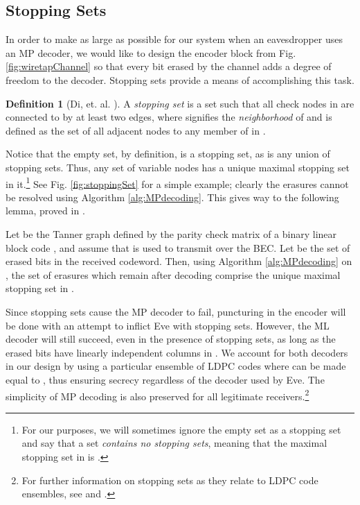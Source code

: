 \documentclass[10pt,twocolumn,twoside]{IEEEtran} \newlength{\pic}
\theoremstyle{definition}
\newtheorem{definition}{Definition}
\theoremstyle{remark}
\theoremstyle{plain}
\begin{document}
\subsection{Stopping Sets}\label{subsec:stoppingSets}

In order to make  as large as possible for our system when an eavesdropper uses an MP decoder, we would like to design the encoder block from Fig. \ref{fig:wiretapChannel} so that every bit erased by the channel adds a degree of freedom to the decoder. Stopping sets provide a means of accomplishing this task.
\begin{definition}[Di, et. al. \cite{Di02StoppingSets}]\label{def:stoppingSet}
 A \emph{stopping set} is a set  such that all check nodes in  are connected to  by at least two edges, where  signifies the \emph{neighborhood} of  and is defined as the set of all adjacent nodes to any member of  in .
\end{definition}
Notice that the empty set, by definition, is a stopping set, as is any union of stopping sets. Thus, any set of variable nodes has a unique maximal stopping set in it.\footnote{For our purposes, we will sometimes ignore the empty set as a stopping set and say that a set  \emph{contains no stopping sets}, meaning that the maximal stopping set in  is .} See Fig. \ref{fig:stoppingSet} for a simple example; clearly the erasures cannot be resolved using Algorithm \ref{alg:MPdecoding}. This gives way to the following lemma, proved in \cite{Di02StoppingSets}.
\begin{lemma} \label{lem:stoppingSets}
   Let  be the Tanner graph defined by the parity check matrix  of a binary linear block code , and assume that  is used to transmit over the BEC. Let  be the set of erased bits in the received codeword. Then, using Algorithm \ref{alg:MPdecoding} on , the set of erasures which remain after decoding comprise the unique maximal stopping set in .
\end{lemma}

Since stopping sets cause the MP decoder to fail, puncturing in the encoder will be done with an attempt to inflict Eve with stopping sets. However, the ML decoder will still succeed, even in the presence of stopping sets, as long as the erased bits have linearly independent columns in . We account for both decoders in our design by using a particular ensemble of LDPC codes where  can be made equal to , thus ensuring secrecy regardless of the decoder used by Eve. The simplicity of MP decoding is also preserved for all legitimate receivers.\footnote{For further information on stopping sets as they relate to LDPC code ensembles, see \cite{Rosnes09} and \cite{Orlitsky05}.}
\end{document}
